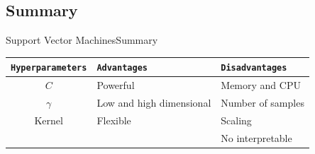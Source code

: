 \documentclass[10pt,compress]{beamer} %
\begin{document}
\subsection{Summary}
\begin{frame}{Support Vector Machines}{Summary}
	\begin{center}
	\begin{tabular}{cp{3cm}p{3cm}}\hline
	 	\texttt{Hyperparameters}  & \texttt{Advantages}  & \texttt{Disadvantages} \\\hline
	 	$C$                       & Powerful             & Memory and CPU  \\
	 	$\gamma$                  & Low and high dimensional & Number of samples   \\
	 	Kernel                    & Flexible             & Scaling  \\
	 	                          &                      & No interpretable  \\
	 	\hline
	\end{tabular}
	\end{center}
\end{frame}
\end{document}
